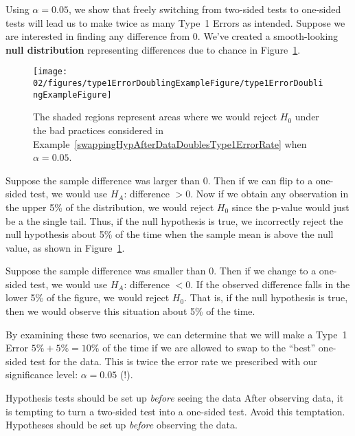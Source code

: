 \begin{example}{Using $\alpha=0.05$, we show that freely switching from two-sided tests to one-sided tests will lead us to make twice as many Type~1 Errors as intended.} \label{swappingHypAfterDataDoublesType1ErrorRate}
Suppose we are interested in finding any difference from 0. We've created a smooth-looking \textbf{null distribution} representing differences due to chance in Figure~\ref{type1ErrorDoublingExampleFigure}.

\begin{figure}[h]
\centering
\texttt{[image: 02/figures/type1ErrorDoublingExampleFigure/type1ErrorDoublingExampleFigure]}
\caption{The shaded regions represent areas where we would reject $H_0$ under the bad practices considered in Example~\ref{swappingHypAfterDataDoublesType1ErrorRate} when $\alpha = 0.05$.}
\label{type1ErrorDoublingExampleFigure}
\end{figure}

Suppose the sample difference was larger than 0. Then if we can flip to a one-sided test, we would use $H_A$: difference $> 0$. Now if we obtain any observation in the upper 5\% of the distribution, we would reject $H_0$ since the p-value would just be a the single tail. Thus, if the null hypothesis is true, we incorrectly reject the null hypothesis about 5\% of the time when the sample mean is above the null value, as shown in Figure~\ref{type1ErrorDoublingExampleFigure}.

Suppose the sample difference was smaller than 0. Then if we change to a one-sided test, we would use $H_A$: difference $< 0$. If the observed difference falls in the lower 5\% of the figure, we would reject $H_0$. That is, if the null hypothesis is true, then we would observe this situation about 5\% of the time.

By examining these two scenarios, we can determine that we will make a Type~1 Error $5\%+5\%=10\%$ of the time if we are allowed to swap to the ``best'' one-sided test for the data. This is twice the error rate we prescribed with our significance level: $\alpha=0.05$ (!).
\end{example}

\begin{caution}{Hypothesis tests should be set up \emph{before} seeing the data}
{After observing data, it is tempting to turn a two-sided test into a one-sided test. Avoid this temptation. Hypotheses should be set up \emph{before} observing the data.}
\end{caution}


